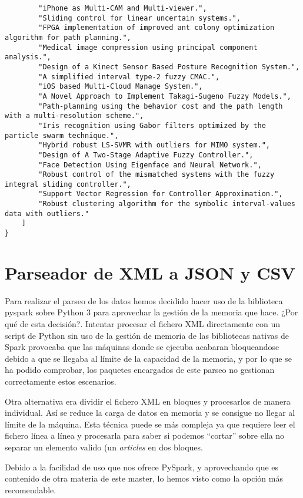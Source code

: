 \begin{verbatim}
        "iPhone as Multi-CAM and Multi-viewer.", 
        "Sliding control for linear uncertain systems.", 
        "FPGA implementation of improved ant colony optimization algorithm for path planning.", 
        "Medical image compression using principal component analysis.", 
        "Design of a Kinect Sensor Based Posture Recognition System.", 
        "A simplified interval type-2 fuzzy CMAC.", 
        "iOS based Multi-Cloud Manage System.", 
        "A Novel Approach to Implement Takagi-Sugeno Fuzzy Models.", 
        "Path-planning using the behavior cost and the path length with a multi-resolution scheme.", 
        "Iris recognition using Gabor filters optimized by the particle swarm technique.", 
        "Hybrid robust LS-SVMR with outliers for MIMO system.", 
        "Design of A Two-Stage Adaptive Fuzzy Controller.", 
        "Face Detection Using Eigenface and Neural Network.", 
        "Robust control of the mismatched systems with the fuzzy integral sliding controller.", 
        "Support Vector Regression for Controller Approximation.", 
        "Robust clustering algorithm for the symbolic interval-values data with outliers."
    ]
}
\end{verbatim}

\section{Parseador de XML a JSON y CSV}\label{sec:parser}

Para realizar el parseo de los datos hemos decidido hacer uso de la biblioteca pyspark sobre Python 3 para aprovechar la gestión de la memoria que hace. ¿Por qué de esta decisión?. Intentar procesar el fichero \gls{XML} directamente con un script de Python sin uso de la gestión de memoria de las bibliotecas nativas de Spark provocaba que las máquinas donde se ejecuba acabaran bloqueandose debido a que se llegaba al límite de la capacidad de la memoria, y por lo que se ha podido comprobar, los paquetes encargados de este parseo no gestionan correctamente estos escenarios.

Otra alternativa era dividir el fichero XML en bloques y procesarlos de manera individual. Así se reduce la carga de datos en memoria y se consigue no llegar al límite de la máquina. Esta técnica puede se más compleja ya que requiere leer el fichero línea a línea y procesarla para saber si podemos ``cortar'' sobre ella no separar un elemento valido (un \textit{articles} en dos bloques.

Debido a la facilidad de uso que nos ofrece PySpark, y aprovechando que es contenido de otra materia de este master, lo hemos visto como la opción más recomendable.


